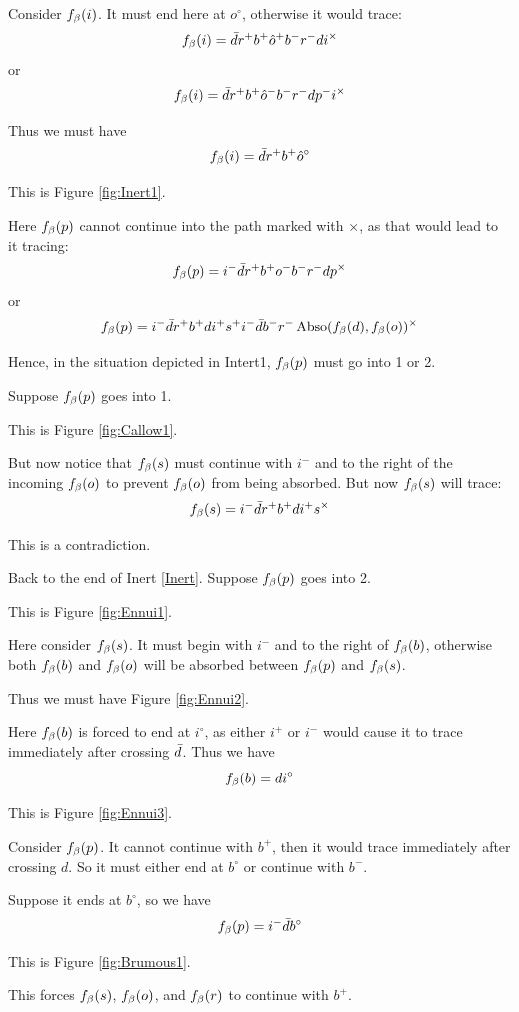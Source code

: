 Consider $f_\beta(i)$. It must end here at $o^\circ$, otherwise it would trace:
\[
f_\beta(i) = \bar{d} r^+ b^+ \hat{o}^+ b^- r^- d i^\times
\]
or
\[
f_\beta(i) = \bar{d} r^+ b^+ \hat{o}^- b^- r^- d p^- i^\times
\]

Thus we must have
\[
f_\beta(i) = \bar{d} r^+ b^+ \hat{o}^\circ
\]

This is Figure \ref{fig:Inert1}.

Here $f_\beta(p)$ cannot continue into the path marked with $\times$, as that would lead to it tracing:
\[
f_\beta(p) = i^- \bar{d} r^+ b^+ o^- b^- r^- d p^\times
\]
or 
\[
f_\beta(p) = i^- \bar{d} r^+ b^+ d i^+ s^+ i^- \bar{d} b^- r^- \operatorname{Abso}(f_\beta(d), f_\beta(o))^\times
\]

Hence, in the situation depicted in Intert1, $f_\beta(p)$ must go into 1 or 2.

\label{Callow}
Suppose $f_\beta(p)$ goes into 1. 

This is Figure \ref{fig:Callow1}.

But now notice that $f_\beta(s)$ must continue with $i^-$ and to the right of the incoming $f_\beta(o)$ to prevent $f_\beta(o)$ from being absorbed. But now $f_\beta(s)$ will trace:
\[
f_\beta(s) = i^- \bar{d} r^+ b^+ d i^+ s^\times
\]

This is a contradiction.

\label{Ennui}
Back to the end of Inert \ref{Inert}. Suppose $f_\beta(p)$ goes into 2.

This is Figure \ref{fig:Ennui1}.

Here consider $f_\beta(s)$. It must begin with $i^-$ and to the right of $f_\beta(b)$, otherwise both $f_\beta(b)$ and $f_\beta(o)$ will be absorbed between $f_\beta(p)$ and $f_\beta(s)$.

Thus we must have Figure \ref{fig:Ennui2}.

Here $f_\beta(b)$ is forced to end at $i^\circ$, as either $i^+$ or $i^-$ would cause it to trace immediately after crossing $\bar{d}$. Thus we have
\[
f_\beta(b) = d i^\circ
\]

This is Figure \ref{fig:Ennui3}. 

Consider $f_\beta(p)$. It cannot continue with $b^+$, then it would trace immediately after crossing $d$. So it must either end at $b^\circ$ or continue with $b^-$.

\label{Brumous}
Suppose it ends at $b^\circ$, so we have
\[
f_\beta(p) = i^- \bar{d} b^\circ
\]

This is Figure \ref{fig:Brumous1}.

This forces $f_\beta(s)$, $f_\beta(o)$, and $f_\beta(r)$ to continue with $b^+$.

